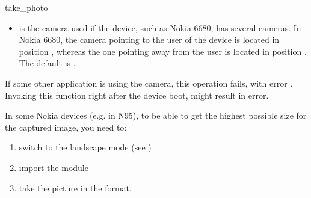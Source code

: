 \begin{funcdesc}{take_photo}{}
\begin{itemize}
	\begin{itemize}
	\item {} \newline
Sets white balance automatically. Default value, always supported
	\item {} \newline
Sets white balance to normal daylight
	\item {}' \newline
Sets white balance to overcast daylight
	\item {} \newline
Sets white balance to tungsten filament lighting
	\item {}' \newline
Sets white balance to fluorescent tube lighting
	\item {} \newline
Sets white balance to flash lighting
	\end{itemize}
\item {} is the camera used if the device, such as Nokia 6680, has several cameras. In Nokia 6680, the camera pointing to the user of the device is located in position , whereas the one pointing away from the user is located in position . The default  is .
\end{itemize}

If some other application is using the camera, this operation fails, with error 
. Invoking this function right after the device 
boot, might result in  error.

In some Nokia devices (e.g. in N95), to be able to get the highest possible size 
for the captured image, you need to:

\begin{enumerate}
\item switch to the landscape mode (see )
\item import the  module
\item take the picture in the  format.
\end{enumerate}

\item

\end{funcdesc}


